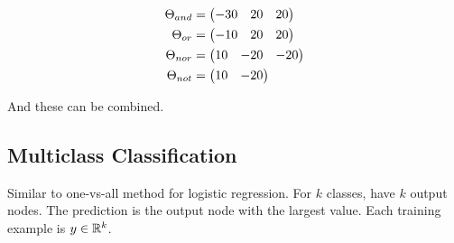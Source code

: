 \begin{align*}
  \Theta_{and} &= \mqty(-30 & 20 & 20) \\
  \Theta_{or}  &= \mqty(-10 & 20 & 20) \\
  \Theta_{nor} &= \mqty(10 & -20 & -20) \\
  \Theta_{not} &= \mqty(10 & -20)
\end{align*}

And these can be combined.

\subsection{Multiclass Classification}

Similar to one-vs-all method for logistic regression.
For $k$ classes, have $k$ output nodes.
The prediction is the output node with the largest value.
Each training example is $y \in \mathbb{R}^k$.